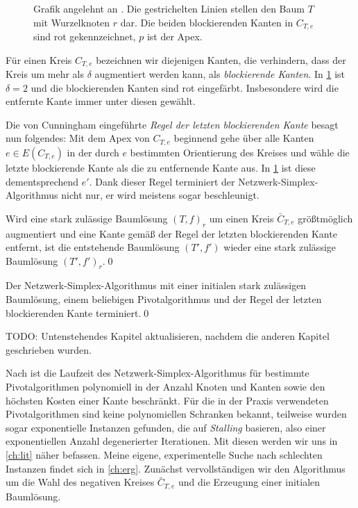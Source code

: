 \begin{figure}[!ht]\centering
    
    \caption{Grafik angelehnt an \cite[S. 372]{GNA}. Die gestrichelten Linien stellen den Baum $T$ mit Wurzelknoten $r$ dar. Die beiden blockierenden Kanten in $C_{T,e}$ sind rot gekennzeichnet, $p$ ist der Apex.}
    \label{fig:rule}
\end{figure}

Für einen Kreis $C_{T,e}$ bezeichnen wir diejenigen Kanten, die verhindern, dass der Kreis um mehr als $\delta$ augmentiert werden kann, als \emph{blockierende Kanten}. In \cref{fig:rule} ist $\delta=2$ und die blockierenden Kanten sind rot eingefärbt. Insbesondere wird die entfernte Kante immer unter diesen gewählt.

Die von Cunningham eingeführte \emph{Regel der letzten blockierenden Kante} besagt nun folgendes: Mit dem Apex von $C_{T,e}$ beginnend gehe über alle Kanten $e\in E(C_{T,e})$ in der durch $e$ bestimmten Orientierung des Kreises und wähle die letzte blockierende Kante als die zu entfernende Kante aus. In \cref{fig:rule} ist diese dementsprechend $e'$. Dank dieser Regel terminiert der Netzwerk-Simplex-Algorithmus nicht nur, er wird meistens sogar beschleunigt. 
 
\begin{lem}
Wird eine stark zulässige Baumlösung $(T,f)_r$ um einen Kreis $\bar{C}_{T,e}$ größtmöglich augmentiert und eine Kante gemäß  der Regel der letzten blockierenden Kante entfernt, ist die entstehende Baumlösung $(T',f')$ wieder eine stark zulässige Baumlösung $(T',f')_r$.\qed\end{lem}

\begin{thm}
Der Netzwerk-Simplex-Algorithmus mit einer initialen stark zulässigen Baumlösung, einem beliebigen Pivotalgorithmus und der Regel der letzten blockierenden Kante terminiert.\qed\end{thm}

TODO: Untenstehendes Kapitel aktualisieren, nachdem die anderen Kapitel geschrieben wurden.

Nach \cite[S. 359]{GNA} ist die Laufzeit des Netzwerk-Simplex-Algorithmus für bestimmte Pivotalgorithmen polynomiell in der Anzahl Knoten und Kanten sowie den höchsten Kosten einer Kante beschränkt. Für die in der Praxis verwendeten Pivotalgorithmen sind keine polynomiellen Schranken bekannt, teilweise wurden sogar exponentielle Instanzen gefunden, die auf \emph{Stalling} basieren, also einer exponentiellen Anzahl degenerierter Iterationen. Mit diesen werden wir uns in \cref{ch:lit} näher befassen. Meine eigene, experimentelle Suche nach schlechten Instanzen findet sich in \cref{ch:erg}. Zunächst vervollständigen wir den Algorithmus um die Wahl des negativen Kreises $\bar{C}_{T,e}$ und die Erzeugung einer initialen Baumlösung.

